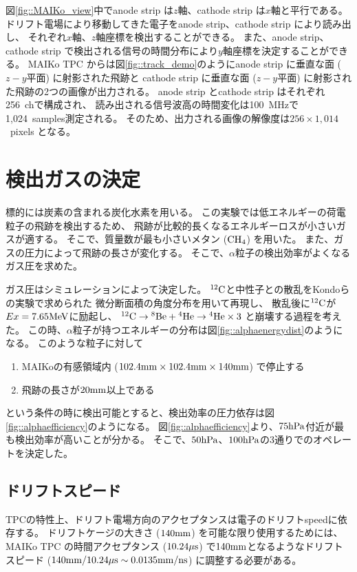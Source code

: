 図\ref{fig::MAIKo_view}中でanode strip は$z$軸、cathode strip は$x$軸と平行である。
ドリフト電場により移動してきた電子をanode strip、cathode strip により読み出し、
それぞれ$x$軸、$z$軸座標を検出することができる。
また、anode strip、cathode strip で検出される信号の時間分布により$y$軸座標を決定することができる。
MAIKo TPC からは図\ref{fig::track_demo}のようにanode strip に垂直な面 ($z-y$平面) に射影された飛跡と
cathode strip に垂直な面 ($z-y$平面) に射影された飛跡の2つの画像が出力される。
anode strip とcathode strip はそれぞれ256~chで構成され、
読み出される信号波高の時間変化は100~MHzで1,024~samples測定される。
そのため、出力される画像の解像度は$256\times1,014$~pixels となる。

\section{検出ガスの決定}
標的には炭素の含まれる炭化水素を用いる。
この実験では低エネルギーの荷電粒子の飛跡を検出するため、
飛跡が比較的長くなるエネルギーロスが小さいガスが適する。
そこで、質量数が最も小さいメタン ($\rm{CH}_{4}$) を用いた。
また、ガスの圧力によって飛跡の長さが変化する。
そこで、$\alpha$粒子の検出効率がよくなるガス圧を求めた。

ガス圧はシミュレーションによって決定した。
${}^{12}\rm{C}$と中性子との散乱をKondoらの実験で求められた
微分断面積の角度分布を用いて再現し、
散乱後に${}^{12}\rm{C}$が$Ex = 7.65\rm{MeV}$に励起し、
${}^{12}\rm{C}\rightarrow{}^{8}\rm{Be}+{}^{4}\rm{He}\rightarrow{}^{4}\rm{He}\times 3$
と崩壊する過程を考えた。
この時、$\alpha$粒子が持つエネルギーの分布は図\ref{fig::alphaenergydist}のようになる。
このような粒子に対して
\begin{enumerate}
\item
  MAIKoの有感領域内 ($102.4\rm{mm}\times 102.4\rm{mm}\times 140\rm{mm}$) で停止する
\item
  飛跡の長さが$20\rm{mm}$以上である
\end{enumerate}
という条件の時に検出可能とすると、検出効率の圧力依存は図\ref{fig::alphaefficiency}のようになる。
図\ref{fig::alphaefficiency}より、$75\rm{hPa}$付近が最も検出効率が高いことが分かる。
そこで、$50\rm{hPa}$、$100\rm{hPa}$の3通りでのオペレートを決定した。

\subsection{ドリフトスピード}
TPCの特性上、ドリフト電場方向のアクセプタンスは電子のドリフトspeedに依存する。
ドリフトケージの大きさ ($140\rm{mm}$) を可能な限り使用するためには、
MAIKo TPC の時間アクセプタンス ($10.24\rm{\mu s}$) で$140\rm{mm}$となるようなドリフトスピード
($140\rm{mm}/10.24\rm{\mu s} \sim 0.0135\rm{mm/ns}$) に調整する必要がある。

